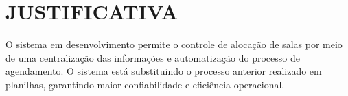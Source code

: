 \section{JUSTIFICATIVA}

O sistema em desenvolvimento permite o controle de alocação de salas por meio de uma centralização das informações e automatização do processo de agendamento. O sistema está substituindo o processo anterior realizado em planilhas, garantindo maior confiabilidade e eficiência operacional.